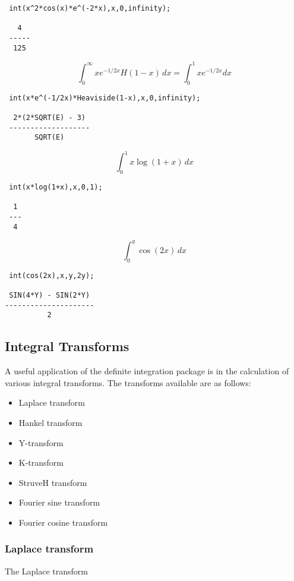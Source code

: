 \begin{verbatim}
 int(x^2*cos(x)*e^(-2*x),x,0,infinity);

   4
 -----
  125
\end{verbatim}

\[
\int_{0}^{\infty} x e^{-1/2x} H(1-x) \,dx = \int_{0}^{1} x e^{-1/2x} dx
\]

\begin{verbatim}
 int(x*e^(-1/2x)*Heaviside(1-x),x,0,infinity);

  2*(2*SQRT(E) - 3)
 -------------------
       SQRT(E)
\end{verbatim}

\[
\int_{0}^{1} x \log(1+x) \,dx
\]

\begin{verbatim}
 int(x*log(1+x),x,0,1);

  1
 ---
  4
\end{verbatim}

\[
\int_{0}^{y} \cos(2x) \,dx
\]

\begin{verbatim}
 int(cos(2x),x,y,2y);

 SIN(4*Y) - SIN(2*Y)
---------------------
          2
\end{verbatim}


\subsection{Integral Transforms}

A useful application of the definite integration package is in the
calculation of various integral transforms. The transforms
available are as follows:

\begin{itemize}
\item Laplace transform
\item Hankel transform
\item Y-transform
\item K-transform
\item StruveH transform
\item Fourier sine transform
\item Fourier cosine transform
\end{itemize}

\subsubsection{Laplace transform}

The Laplace transform

